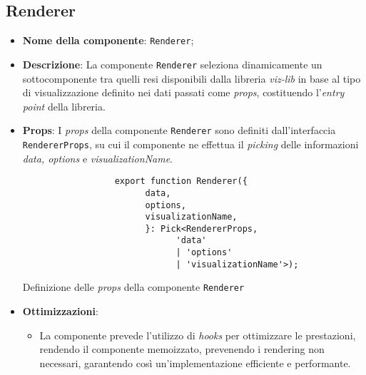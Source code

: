 \subsection{Renderer}
\begin{itemize}
      \item \textbf{Nome della componente}: \texttt{Renderer};
      \item \textbf{Descrizione}: La componente \texttt{Renderer} seleziona dinamicamente un sottocomponente tra quelli resi disponibili dalla libreria \textit{viz-lib}
            in base al tipo di visualizzazione definito nei dati passati come \textit{props}, costituendo l'\textit{entry point} della libreria. \newline
      \item \textbf{Props}: I \textit{props} della componente \texttt{Renderer} sono definiti dall'interfaccia \\
            \texttt{RendererProps}, su cui il componente ne effettua il \textit{picking}
            delle informazioni \textit{data, options} e \textit{visualizationName}.
            \begin{listing}[H]
                  \begin{verbatim}
                  export function Renderer({
                        data,
                        options,
                        visualizationName,
                        }: Pick<RendererProps, 
                              'data' 
                              | 'options' 
                              | 'visualizationName'>);
                  \end{verbatim}
                  \caption{Definizione delle \textit{props} della componente \texttt{Renderer}}
                  \label{listing:rendererPropsInComponent}
            \end{listing}
      \item \textbf{Ottimizzazioni}:
            \begin{itemize}
                  \item La componente prevede l'utilizzo di \textit{hooks} per ottimizzare le prestazioni, rendendo il componente \gls{memoizzato}\glox, prevenendo i rendering
                        non necessari, garantendo così un'implementazione efficiente e performante.
            \end{itemize}
\end{itemize}

